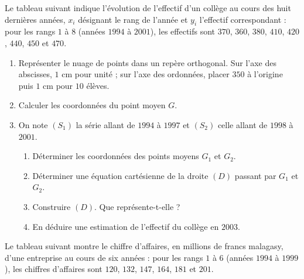 \begin{annales}
Le tableau suivant indique l'évolution de l'effectif d'un collège au cours
des huit dernières années, $x_{i}$ désignant le rang de l'année et $y_{i}$
l'effectif correspondant : pour les rangs $1$ à $8$ (années $1994$ à
$2001$), les effectifs sont $370$, $360$, $380$, $410$, $420$, $440$, $450$
et $470$.

\begin{enumerate}[label=\textbf{\arabic*)}, leftmargin=*, itemsep=0.15em]
  \item Représenter le nuage de points dans un repère orthogonal. Sur l'axe
        des abscisses, $1$ cm pour unité ; sur l'axe des ordonnées, placer
        $350$ à l'origine puis $1$ cm pour $10$ élèves.
  \item Calculer les coordonnées du point moyen $G$.
  \item On note $(S_{1})$ la série allant de $1994$ à $1997$ et $(S_{2})$
        celle allant de $1998$ à $2001$.
        \begin{enumerate}[label=\textbf{\alph*)}, leftmargin=1.4em]
          \item Déterminer les coordonnées des points moyens $G_{1}$ et
                $G_{2}$.
          \item Déterminer une équation cartésienne de la droite $(D)$
                passant par $G_{1}$ et $G_{2}$.
          \item Construire $(D)$. Que représente-t-elle ?
          \item En déduire une estimation de l'effectif du collège en
                $2003$.
        \end{enumerate}
\end{enumerate}

Le tableau suivant montre le chiffre d'affaires, en millions de francs
malagasy, d'une entreprise au cours de six années : pour les rangs $1$ à $6$
(années $1994$ à $1999$), les chiffres d'affaires sont $120$, $132$, $147$,
$164$, $181$ et $201$.


\end{annales}
